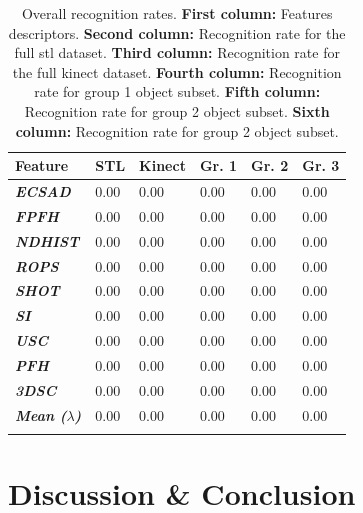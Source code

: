 \documentclass[10pt,twocolumn,letterpaper]{article}
\begin{document}
\begin{table}[ht]
\centering
\begin{tabular}{llllll}
\hline
\textbf{Feature} & \textbf{STL} & \textbf{Kinect} & \textbf{Gr. 1}  &\textbf{Gr. 2} &\textbf{Gr. 3} \\
\hline
 \textbf{\textit{ECSAD}}  & 0.00 & 0.00 & 0.00 & 0.00 & 0.00 \\
 \textbf{\textit{FPFH}}   & 0.00 & 0.00 & 0.00 & 0.00 & 0.00 \\
 \textbf{\textit{NDHIST}} & 0.00 & 0.00 & 0.00 & 0.00 & 0.00 \\
 \textbf{\textit{ROPS}}   & 0.00 & 0.00 & 0.00 & 0.00 & 0.00 \\
 \textbf{\textit{SHOT}}   & 0.00 & 0.00 & 0.00 & 0.00 & 0.00 \\
 \textbf{\textit{SI}}     & 0.00 & 0.00 & 0.00 & 0.00 & 0.00 \\
 \textbf{\textit{USC}}    & 0.00 & 0.00 & 0.00 & 0.00 & 0.00 \\
 \textbf{\textit{PFH}}    & 0.00 & 0.00 & 0.00 & 0.00 & 0.00 \\
 \textbf{\textit{3DSC}}   & 0.00 & 0.00 & 0.00 & 0.00 & 0.00 \\
 \hline
 \hline
 \textbf{\textit{Mean ($\lambda$)}}   & 0.00 & 0.00 & 0.00 & 0.00 & 0.00 \\
 \hline
 \\
\end{tabular}
\caption{Overall recognition rates. \textbf{First column:} Features descriptors. \textbf{Second column:} Recognition rate for the full stl dataset. \textbf{Third column:} Recognition rate for the full kinect dataset. \textbf{Fourth column:} Recognition rate for group 1 object subset. \textbf{Fifth column:} Recognition rate for group 2 object subset. \textbf{Sixth column:} Recognition rate for group 2 object subset.}
\label{tab:recognition}
\end{table}

\section{Discussion \& Conclusion}\label{sec:conclusion}



{\small


}
\end{document}
